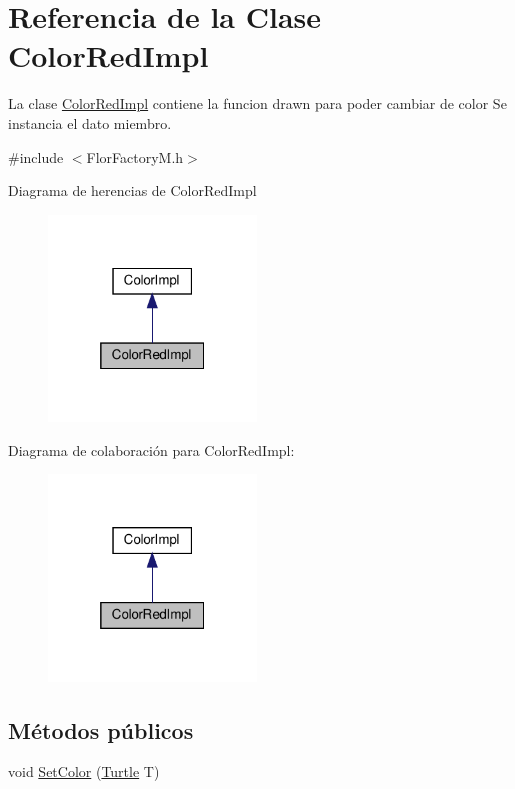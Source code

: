 \hypertarget{classColorRedImpl}{}\section{Referencia de la Clase Color\+Red\+Impl}
\label{classColorRedImpl}


La clase \hyperlink{classColorRedImpl}{Color\+Red\+Impl} contiene la funcion drawn para poder cambiar de color  Se instancia el dato miembro.  




{\ttfamily \#include $<$Flor\+Factory\+M.\+h$>$}



Diagrama de herencias de Color\+Red\+Impl
\nopagebreak
\begin{figure}[H]
\begin{center}
\leavevmode
\includegraphics[width=157pt]{classColorRedImpl__inherit__graph}
\end{center}
\end{figure}


Diagrama de colaboración para Color\+Red\+Impl\+:
\nopagebreak
\begin{figure}[H]
\begin{center}
\leavevmode
\includegraphics[width=157pt]{classColorRedImpl__coll__graph}
\end{center}
\end{figure}
\subsection*{Métodos públicos}
\begin{DoxyCompactItemize}
\item 
void \hyperlink{classColorRedImpl_ab094a64f146cc3b6abeea2b60a289f49}{Set\+Color} (\hyperlink{classTurtle}{Turtle} T)
\end{DoxyCompactItemize}


